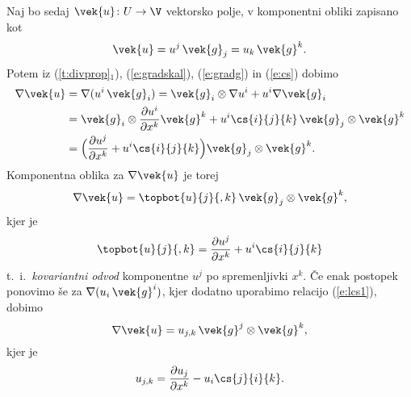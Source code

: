 

Naj bo sedaj $\vek{u}\colon U\to\V$ vektorsko polje, v komponentni obliki
zapisano kot
\[ \vek{u}=u^j\,\vek{g}_j=u_k\,\vek{g}^k. \]
Potem iz (\ref{t:divprop}$_1$), (\ref{e:gradskal}), (\ref{e:gradg}) in (\ref{e:cs}) dobimo
\begin{align*}
	\nabla\vek{u}&=\nabla(u^i\,\vek{g}_i)=\vek{g}_i\otimes\nabla u^i+u^i\nabla\vek{g}_i\\
	&=\vek{g}_i\otimes\frac{\partial u^i}{\partial x^k}\vek{g}^k+
	u^i\cs{i}{j}{k}\,\vek{g}_j\otimes\vek{g}^k\\
	&=\Big(\frac{\partial u^j}{\partial x^k}+u^i\cs{i}{j}{k}\Big)\vek{g}_j\otimes\vek{g}^k.
\end{align*}
Komponentna oblika za $\nabla\vek{u}$ je torej
\[ \nabla\vek{u}=\topbot{u}{j}{,k}\,\vek{g}_j\otimes\vek{g}^k, \]
kjer je
\[
	\topbot{u}{j}{,k}=\frac{\partial u^j}{\partial x^k}+u^i\cs{i}{j}{k}
\]
t.~i.~\emph{kovariantni odvod} komponentne $u^j$ po spremenljivki $x^k$.
Če enak postopek ponovimo še za $\nabla(u_i\,\vek{g}^i)$,
kjer dodatno uporabimo relacijo (\ref{e:lcs1}), dobimo
\begin{equation} \label{e:nimena1}
	\nabla\vek{u}=u_{j,k}\,\vek{g}^j\otimes\vek{g}^k,
\end{equation}
kjer je
\begin{equation} \label{e:kov2}
	u_{j,k}=\frac{\partial u_j}{\partial x^k}-u_i\cs{j}{i}{k}.
\end{equation}